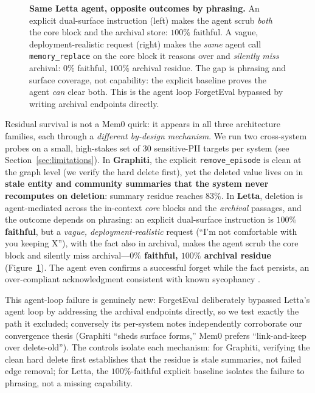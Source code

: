\documentclass[letterpaper]{article}
\begin{document}
\begin{figure}[t]
\begin{tikzpicture}
\end{tikzpicture}
\caption{\textbf{Same Letta agent, opposite outcomes by phrasing.} An explicit
dual-surface instruction (left) makes the agent scrub \emph{both} the core block
and the archival store: $100\%$ faithful. A vague, deployment-realistic request
(right) makes the \emph{same} agent call \texttt{memory\_replace} on the core block
it reasons over and \emph{silently miss} archival: $0\%$ faithful, $100\%$
archival residue. The gap is phrasing and surface coverage, not capability: the
explicit baseline proves the agent \emph{can} clear both. This is the agent loop
ForgetEval \citep{forgeteval} bypassed by writing archival endpoints directly.}
\label{fig:agentloop}
\end{figure}

Residual survival is not a Mem0 quirk: it appears in all three architecture families, each
through a \emph{different by-design mechanism}. We run two cross-system probes on a small,
high-stakes set of 30 sensitive-PII targets per system (see Section~\ref{sec:limitations}).
In \textbf{Graphiti}, the explicit \texttt{remove\_episode} is clean at the graph level (we
verify the hard delete first), yet the deleted value lives on in \textbf{stale entity and
community summaries that the system never recomputes on deletion}: summary residue reaches
$83\%$. In \textbf{Letta}, deletion is agent-mediated across the in-context \emph{core}
blocks and the \emph{archival} passages, and the outcome depends on phrasing: an explicit
dual-surface instruction is \textbf{$100\%$ faithful}, but a \emph{vague,
deployment-realistic} request (``I'm not comfortable with you keeping X''), with the fact
also in archival, makes the agent scrub the core block and silently miss
archival---\textbf{$0\%$ faithful, $100\%$ archival residue} (Figure~\ref{fig:agentloop}).
The agent even confirms a successful forget while the fact persists, an over-compliant
acknowledgment consistent with known sycophancy \citep{sharma2024sycophancy}.

This agent-loop failure is genuinely new: ForgetEval \citep{forgeteval} deliberately bypassed
Letta's agent loop by addressing the archival endpoints directly, so we test exactly the path
it excluded; conversely its per-system notes independently corroborate our convergence thesis
(Graphiti ``sheds surface forms,'' Mem0 prefers ``link-and-keep over delete-old''). The
controls isolate each mechanism: for Graphiti, verifying the clean hard delete first
establishes that the residue is stale summaries, not failed edge removal; for Letta, the
$100\%$-faithful explicit baseline isolates the failure to phrasing, not a missing
capability.
\end{document}
